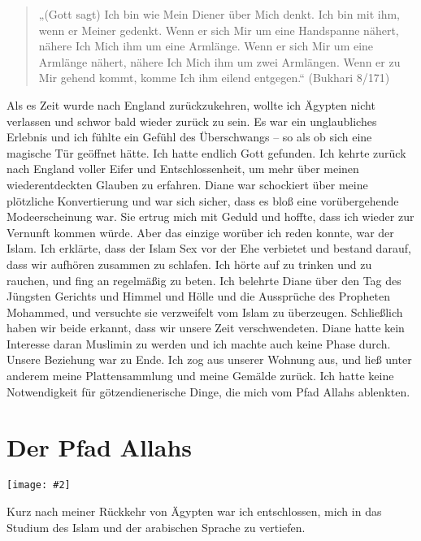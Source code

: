\documentclass[12pt]{memoir}
\newcommand{\img}[3]{\begin{center}%
\texttt{[image: \#2]}\\{\small\em#3}%
\end{center}}
\begin{document}
\begin{quote}
„(Gott sagt) Ich bin wie Mein Diener über Mich denkt.
Ich bin mit ihm, wenn er Meiner gedenkt.
Wenn er sich Mir um eine Handspanne nähert,
nähere Ich Mich ihm um eine Armlänge.
Wenn er sich Mir um eine Armlänge nähert,
nähere Ich Mich ihm um zwei Armlängen.
Wenn er zu Mir gehend kommt, komme Ich ihm eilend entgegen.“
(Bukhari 8/171)
\end{quote}

Als es Zeit wurde nach England zurückzukehren,
wollte ich Ägypten nicht verlassen und schwor bald wieder zurück zu sein.
Es war ein unglaubliches Erlebnis und ich fühlte ein Gefühl des Überschwangs –
so als ob sich eine magische Tür geöffnet hätte.
Ich hatte endlich Gott gefunden.
Ich kehrte zurück nach England voller Eifer und Entschlossenheit,
um mehr über meinen wiederentdeckten Glauben zu erfahren.
Diane war schockiert über meine plötzliche Konvertierung und war sich sicher,
dass es bloß eine vorübergehende Modeerscheinung war.
Sie ertrug mich mit Geduld und hoffte,
dass ich wieder zur Vernunft kommen würde.
Aber das einzige worüber ich reden konnte, war der Islam.
Ich erklärte, dass der Islam Sex vor der Ehe verbietet und bestand darauf,
dass wir aufhören zusammen zu schlafen.
Ich hörte auf zu trinken und zu rauchen, und fing an regelmäßig zu beten.
Ich belehrte Diane über den Tag des Jüngsten Gerichts und Himmel und Hölle
und die Aussprüche des Propheten Mohammed,
und versuchte sie verzweifelt vom Islam zu überzeugen.
Schließlich haben wir beide erkannt, dass wir unsere Zeit verschwendeten.
Diane hatte kein Interesse daran Muslimin zu werden
und ich machte auch keine Phase durch.
Unsere Beziehung war zu Ende.
Ich zog aus unserer Wohnung aus,
und ließ unter anderem meine Plattensammlung und meine Gemälde zurück.
Ich hatte keine Notwendigkeit
für götzendienerische Dinge, die mich vom Pfad Allahs ablenkten.


\chapter{Der Pfad Allahs}

\img{scale=1}{Hassan_1980.jpg}{}

Kurz nach meiner Rückkehr von Ägypten war ich entschlossen,
mich in das Studium des Islam und der arabischen Sprache zu vertiefen.
\end{document}
